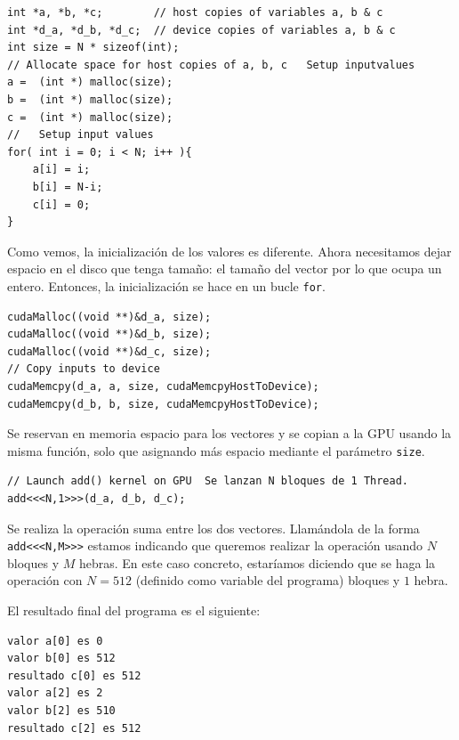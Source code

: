 \documentclass[11pt]{article}
\def\inline{\lstinline[basicstyle=\ttfamily,keywordstyle={}]}
\begin{document}
\begin{verbatim}
int *a, *b, *c;        // host copies of variables a, b & c
int *d_a, *d_b, *d_c;  // device copies of variables a, b & c
int size = N * sizeof(int);
// Allocate space for host copies of a, b, c   Setup inputvalues  
a =  (int *) malloc(size); 
b =  (int *) malloc(size); 
c =  (int *) malloc(size); 
//   Setup input values  
for( int i = 0; i < N; i++ ){
	a[i] = i;
  	b[i] = N-i;
	c[i] = 0;
}	
\end{verbatim}

Como vemos, la inicialización de los valores es diferente. Ahora necesitamos dejar espacio en el disco que tenga tamaño: el tamaño del vector por lo que ocupa un entero. Entonces, la inicialización se hace en un bucle \inline{for}.
\begin{verbatim}
cudaMalloc((void **)&d_a, size);
cudaMalloc((void **)&d_b, size);
cudaMalloc((void **)&d_c, size);
// Copy inputs to device
cudaMemcpy(d_a, a, size, cudaMemcpyHostToDevice);
cudaMemcpy(d_b, b, size, cudaMemcpyHostToDevice);
\end{verbatim}

Se reservan en memoria espacio para los vectores y se copian a la GPU usando la misma función, solo que asignando más espacio mediante el parámetro \inline{size}.

\begin{verbatim}
// Launch add() kernel on GPU  Se lanzan N bloques de 1 Thread.
add<<<N,1>>>(d_a, d_b, d_c);
\end{verbatim}
Se realiza la operación suma entre los dos vectores. Llamándola de la forma \inline{add<<<N,M>>>} estamos indicando que queremos realizar la operación usando $N$ bloques y $M$ hebras. En este caso concreto, estaríamos diciendo que se haga la operación con $N = 512$ (definido como variable del programa) bloques y $1$ hebra.

El resultado final del programa es el siguiente:
\begin{verbatim}
valor a[0] es 0
valor b[0] es 512
resultado c[0] es 512
valor a[2] es 2
valor b[2] es 510
resultado c[2] es 512	
\end{verbatim}
\end{document}
